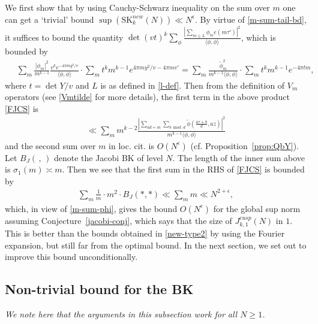 \documentclass[11pt]{amsart}
\numberwithin{equation}{section}
\theoremstyle{plain}
\theoremstyle{definition}
\newcommand{\propref}[1]{Proposition~\ref{#1}}
\newcommand{\conjref}[1]{Conjecture~\ref{#1}}
\newcommand{\mrm}{\mathrm}
\newcommand{\lan}{\langle }
\newcommand{\ran}{\rangle}
\newcommand{\q}{\quad}
\newcommand{\sumn}{\sum \nolimits}
\newcommand{\jkn}{J^{cusp}_{k,1}(N)}
\newcommand{\skk}{\mrm{SK}_k}
\begin{document}
We first show that by using Cauchy-Schwarz inequality on the sum over $m$ one can get a `trivial' bound $\sup(\skk^{new}(N)) \ll N^\epsilon$. By virtue of \eqref{m-sum-tail-bd}, it suffices to bound
the quantity $\displaystyle \det (v t)^k \sumn_\phi \frac{ |\sum_{m \le L} \phi_m e(m \tau')|^2}{\lan \phi,\phi \ran}$, which is bounded by 
\begin{align}\label{FJCS}
\q \sumn_m \frac{ |\phi_m|^2 }{m^{k-1} } \frac{ v^k e^{- 4 \pi m y^2/v} }{\lan \phi,\phi \ran} \cdot \sumn_m t^k m^{k-1} e^{4 \pi m y^2/v - 4 \pi m v'} = \sumn_m \frac{\tilde \phi_m^2}{m^{k-1} \lan \phi,\phi \ran } \cdot \sumn_m t^k m^{k-1} e^{-4 \pi tm},
\end{align}
where $t = \det Y/v$ and $L$ is as defined in \eqref{l-def}.
Then from the definition of $V_m$ operators (see \eqref{Vmtilde} for more details), the first term in the above product \eqref{FJCS} is
\begin{align}
    \ll \sumn_m m^{k-2} \frac{\left|\sum_{ad=m}\sum_{b\bmod d}\widetilde{\phi}\left(\frac{a\tau+b}{d},az\right)\right|^2 }{m^{k-1} \lan \phi,\phi \ran} 
\end{align}
and the second sum over $m$ in loc. cit. is $O(N^\epsilon)$ (cf. \propref{prop:QbY}). Let $B_J(\,,\,)$ denote the Jacobi BK of level $N$. The length of the inner sum above is $\sigma_1(m) \asymp m$.
Then we see that the first sum in the RHS of \eqref{FJCS} is bounded by
\begin{align}
    \sumn_m \frac{1}{m} \cdot m^2 \cdot B_J(*,*) \ll \sumn_m m \ll N^{2+\epsilon},
    \end{align}
which, in view of \eqref{m-sum-phi}, gives the bound $O(N^\epsilon)$ for the global sup norm assuming \conjref{jacobi-conj}, which says that the size of $\jkn$ in $1$. This is better than the bounds obtained in \eqref{new-type2} by using the Fourier expansion, but still far from the optimal bound. In the next section, we set out to improve this bound unconditionally.

\subsection{Non-trivial bound for the BK} \label{new-count-02}
\textit{We note here that the arguments in this subsection work for all $N \ge 1$.}
\end{document}
